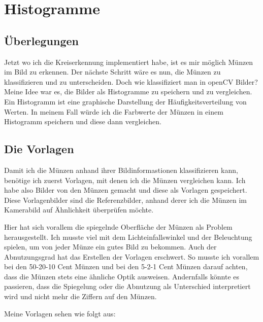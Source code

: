 \section{Histogramme}

\subsection{Überlegungen}
Jetzt wo ich die Kreiserkennung implementiert habe, ist es mir möglich Münzen im Bild zu erkennen. Der nächste Schritt wäre es nun, die Münzen zu klassifizieren und zu unterscheiden. Doch wie klassifiziert man in openCV Bilder? Meine Idee war es, die Bilder als Histogramme zu speichern und zu vergleichen. Ein Histogramm ist eine graphische Darstellung der Häufigkeitsverteilung von Werten. In meinem Fall würde ich die Farbwerte der Münzen in einem Histogramm speichern und diese dann vergleichen.

\subsection{Die Vorlagen}
Damit ich die Münzen anhand ihrer Bildinformastionen klassifizieren kann, benötige ich zuerst Vorlagen, mit denen ich die Münzen vergleichen kann. Ich habe also Bilder von den Münzen gemacht und diese als Vorlagen gespeichert. Diese Vorlagenbilder sind die Referenzbilder, anhand derer ich die Münzen im Kamerabild auf Ähnlichkeit überprüfen möchte.

Hier hat sich vorallem die spiegelnde Oberfläche der Münzen als Problem herausgestellt. Ich musste viel mit dem Lichteinfallswinkel und der Beleuchtung spielen, um von jeder Münze ein gutes Bild zu bekommen. Auch der Abnutzungsgrad hat das Erstellen der Vorlagen erschwert. So musste ich vorallem bei den 50-20-10 Cent Münzen und bei den 5-2-1 Cent Münzen darauf achten, dass die Münzen stets eine ähnliche Optik ausweisen. Andernfalls könnte es passieren, dass die Spiegelung oder die Abnutzung als Unterschied interpretiert wird und nicht mehr die Ziffern auf den Münzen.

Meine Vorlagen sehen wie folgt aus:

